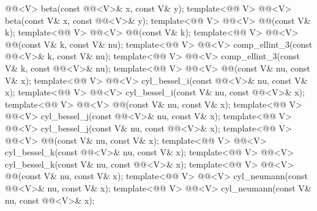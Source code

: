 \begin{itemdecl}
  @@<V> beta(const @@<V>& x, const V& y);
template<@@ V>
  @@<V> beta(const V& x, const @@<V>& y);
template<@@ V> @@<V> @@(const V& k);
template<@@ V> @@<V> @@(const V& k);
template<@@ V>
  @@<V> @@(const V& k, const V& nu);
template<@@ V>
  @@<V> comp_ellint_3(const @@<V>& k, const V& nu);
template<@@ V>
  @@<V> comp_ellint_3(const V& k, const @@<V>& nu);
template<@@ V>
  @@<V> @@(const V& nu, const V& x);
template<@@ V>
  @@<V> cyl_bessel_i(const @@<V>& nu, const V& x);
template<@@ V>
  @@<V> cyl_bessel_i(const V& nu, const @@<V>& x);
template<@@ V>
  @@<V> @@(const V& nu, const V& x);
template<@@ V>
  @@<V> cyl_bessel_j(const @@<V>& nu, const V& x);
template<@@ V>
  @@<V> cyl_bessel_j(const V& nu, const @@<V>& x);
template<@@ V>
  @@<V> @@(const V& nu, const V& x);
template<@@ V>
  @@<V> cyl_bessel_k(const @@<V>& nu, const V& x);
template<@@ V>
  @@<V> cyl_bessel_k(const V& nu, const @@<V>& x);
template<@@ V>
  @@<V> @@(const V& nu, const V& x);
template<@@ V>
  @@<V> cyl_neumann(const @@<V>& nu, const V& x);
template<@@ V>
  @@<V> cyl_neumann(const V& nu, const @@<V>& x);

\end{itemdecl}
